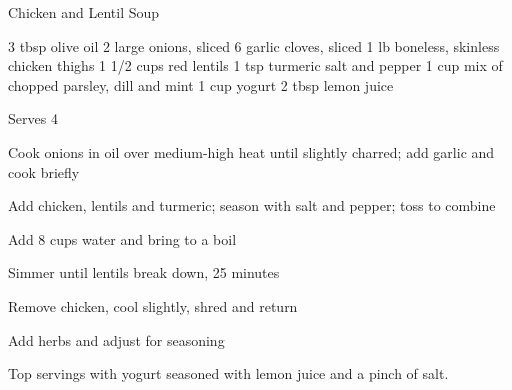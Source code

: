 \begin{denserecipe}{Chicken and Lentil Soup}{\vegetarian{}}
\begin{ingredients}
3 tbsp olive oil
2 large onions, sliced
6 garlic cloves, sliced
1 lb boneless, skinless chicken thighs
1 1/2 cups red lentils
1 tsp turmeric
salt and pepper
1 cup mix of chopped parsley, dill and mint
1 cup yogurt
2 tbsp lemon juice
\end{ingredients}
\nextcolumn
Serves 4
\begin{steps}
    \item Cook onions in oil over medium-high heat until slightly charred; add garlic and cook briefly
    \item Add chicken, lentils and turmeric; season with salt and pepper; toss to combine
    \item Add 8 cups water and bring to a boil
    \item Simmer until lentils break down, 25 minutes
    \item Remove chicken, cool slightly, shred and return
    \item Add herbs and adjust for seasoning
\end{steps}
Top servings with yogurt seasoned with lemon juice and a pinch of salt.
\end{denserecipe}
